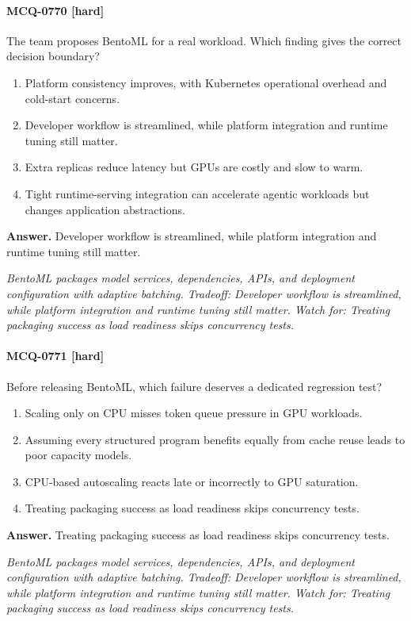 \paragraph{MCQ-0770 [hard]} The team proposes BentoML for a real workload. Which finding gives the correct decision boundary?
\begin{enumerate}[label=\Alph*.]
\item Platform consistency improves, with Kubernetes operational overhead and cold-start concerns.
\item Developer workflow is streamlined, while platform integration and runtime tuning still matter.
\item Extra replicas reduce latency but GPUs are costly and slow to warm.
\item Tight runtime-serving integration can accelerate agentic workloads but changes application abstractions.
\end{enumerate}
\noindent\textbf{Answer.} Developer workflow is streamlined, while platform integration and runtime tuning still matter.
\par\textit{BentoML packages model services, dependencies, APIs, and deployment configuration with adaptive batching. Tradeoff: Developer workflow is streamlined, while platform integration and runtime tuning still matter. Watch for: Treating packaging success as load readiness skips concurrency tests.}
\paragraph{MCQ-0771 [hard]} Before releasing BentoML, which failure deserves a dedicated regression test?
\begin{enumerate}[label=\Alph*.]
\item Scaling only on CPU misses token queue pressure in GPU workloads.
\item Assuming every structured program benefits equally from cache reuse leads to poor capacity models.
\item CPU-based autoscaling reacts late or incorrectly to GPU saturation.
\item Treating packaging success as load readiness skips concurrency tests.
\end{enumerate}
\noindent\textbf{Answer.} Treating packaging success as load readiness skips concurrency tests.
\par\textit{BentoML packages model services, dependencies, APIs, and deployment configuration with adaptive batching. Tradeoff: Developer workflow is streamlined, while platform integration and runtime tuning still matter. Watch for: Treating packaging success as load readiness skips concurrency tests.}
